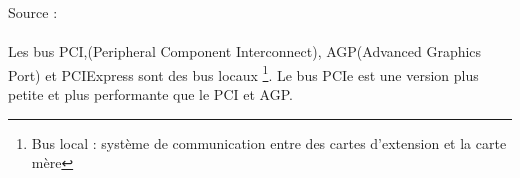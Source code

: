 Source : \cite{historiqueCarte}
\\\\
Les bus PCI,(Peripheral Component Interconnect), AGP(Advanced Graphics Port) et PCIExpress sont des bus locaux
\footnote{ Bus local : système de communication entre des cartes d’extension et la carte mère}.
Le bus PCIe est une version plus petite et plus performante que le PCI et AGP.

